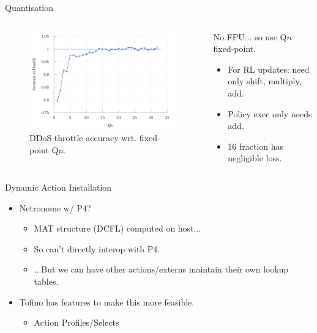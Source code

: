 \documentclass[aspectratio=169,xcolor={dvipsnames}
]{beamer}
\begin{document}
\begin{frame}{Quantisation}
	\begin{columns}
		\begin{column}{0.5\linewidth}
			\begin{figure}
				\includegraphics[width=0.9\linewidth]{../plots/build/marl-quant/accuracy-binary}
				\caption{DDoS throttle accuracy wrt. fixed-point Q$n$.}
			\end{figure}
		\end{column}
		\begin{column}{0.5\linewidth}
			No FPU... so use \alert{Q$n$ fixed-point}.
			\begin{itemize}
				\item For RL updates: need only shift, multiply, add.
				\item \alert{Policy exec only needs add}.
				\item \SI{16}{\bit} fraction has negligible loss.
			\end{itemize}
		\end{column}
	\end{columns}
\end{frame}

\begin{frame}{Dynamic Action Installation}
	\begin{itemize}
		\item Netronome w/ P4?
		\begin{itemize}
			\item MAT structure (DCFL) computed on host...
			\item So can't directly interop with P4.
			\item ...But we can have other actions/externs maintain their own lookup tables.
		\end{itemize}
		\item Tofino has features to make this more feasible.
		\begin{itemize}
			\item Action Profiles/Selects
		\end{itemize}
	\end{itemize}
\end{frame}
\end{document}
